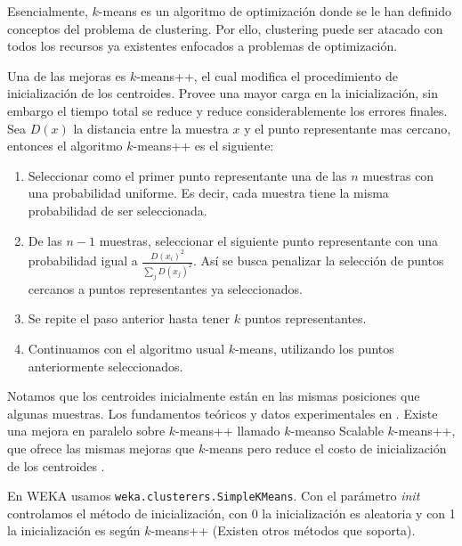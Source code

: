 \documentclass[10pt,a4paper]{article}
\begin{document}
Esencialmente, $k$-means es un algoritmo de optimización donde se le han definido conceptos del problema de clustering. Por ello, clustering puede ser atacado con todos los recursos ya existentes enfocados a problemas de optimización.

Una de las mejoras es $k$-means++, el cual modifica el procedimiento de inicialización de los centroides. Provee una mayor carga en la inicialización, sin embargo el tiempo total se reduce y reduce considerablemente los errores finales. Sea $D(x)$ la distancia entre la muestra $x$ y el punto representante mas cercano, entonces el algoritmo $k$-means++ es el siguiente:
\begin{enumerate}
\item Seleccionar como el primer punto representante una de las $n$ muestras con una probabilidad uniforme. Es decir, cada muestra tiene la misma probabilidad de ser seleccionada.
\item De las $n-1$ muestras, seleccionar el siguiente punto representante con una probabilidad igual a $\frac{D(x_i)^2}{\sum_j D(x_j)^2}$. Así se busca penalizar la selección de puntos cercanos a puntos representantes ya seleccionados.
\item Se repite el paso anterior hasta tener $k$ puntos representantes.
\item Continuamos con el algoritmo usual $k$-means, utilizando los puntos anteriormente seleccionados.
\end{enumerate}
Notamos que los centroides inicialmente están en las mismas posiciones que algunas muestras. Los fundamentos teóricos y datos experimentales en \cite{arthur2007k}. Existe una mejora en paralelo sobre $k$-means++ llamado $k$-means\textbar\textbar  o Scalable $k$-means++, que ofrece las mismas mejoras que $k$-means pero reduce el costo de inicialización de los centroides \cite{bahmani2012scalable}.

En WEKA usamos \lstinline{weka.clusterers.SimpleKMeans}. Con el parámetro \textit{init} controlamos el método de inicialización, con 0 la inicialización es aleatoria y con 1 la inicialización es según $k$-means++ (Existen otros métodos que soporta).
\end{document}
